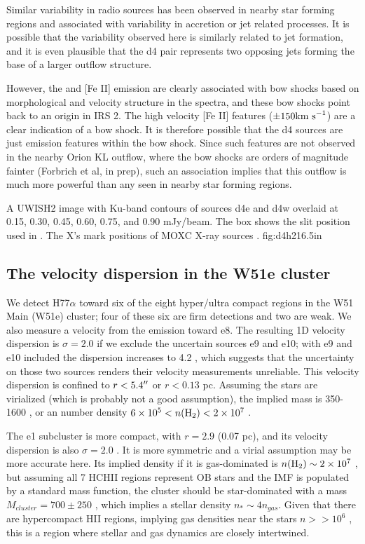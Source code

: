 Similar variability in radio sources has been observed in nearby star forming
regions \citep{Liu2014c,Forbrich2013a} and associated with variability in
accretion or jet related processes.  It is possible that the variability
observed here is similarly related to jet formation, and it is even plausible
that the d4 pair represents two opposing jets forming the base of a larger
outflow structure.

However, the \hh and [Fe II] emission are clearly associated with bow shocks
based on morphological and velocity structure in the \citet{Hodapp2002a}
spectra, and these bow shocks point back to an origin in IRS 2.  The high
velocity [Fe II] features ($\pm150 \textrm{km~s}^{-1}$) are a clear indication of a bow
shock.  It is therefore possible that the d4 sources are just emission features
within the bow shock.  Since such features are not observed in the nearby Orion
KL outflow, where the bow shocks are orders of magnitude fainter (Forbrich et
al, in prep), such an association implies that this outflow is much more
powerful than any seen in nearby star forming regions.

{A UWISH2 \hh image with Ku-band contours of sources d4e and d4w overlaid at
0.15, 0.30, 0.45, 0.60, 0.75, and 0.90 mJy/beam.  The box shows the slit
position used in \citet{Hodapp2002a}.  The X's mark positions of MOXC X-ray
sources \citep{Townsley2014a}.
}
{fig:d4h2}{1}{6.5in}

\subsection{The velocity dispersion in the W51e cluster}
\label{sec:vdisp}
We detect H77$\alpha$ toward six of the eight hyper/ultra compact \hii regions
in the W51 Main (W51e) cluster; four of these six are firm detections and two
are weak.  We also measure a velocity from the \formaldehyde emission toward
e8.  The resulting 1D velocity dispersion is $\sigma=2.0$ \kms if we exclude
the uncertain sources e9
and e10; with e9 and e10 included the dispersion increases to 4.2 \kms, which
suggests that the uncertainty on those two sources renders their velocity
measurements unreliable.  This velocity dispersion is confined to
$r<5.4\mbox{$^{\prime\prime}$}$ or $r<0.13$ pc.  Assuming the stars are virialized (which is
probably not a good assumption), the implied mass is 350-1600 \msun, or an \hh
number density $6\times10^{5} < n(\textrm{H}_{2}) < 2\times10^{7}$ \percc.

The e1 subcluster is more compact, with $r=2.9$ \arcsec (0.07 pc), and its
velocity dispersion is also $\sigma=2.0$ \kms.  It is more symmetric and a virial
assumption may be more accurate here.  Its implied density if it is gas-dominated
is $n(\textrm{H}_{2})\sim2\times10^{7}$ \percc, but assuming all 7 HCHII regions represent OB
stars and the IMF is populated by a standard \citet{Kroupa2001a} mass function,
the cluster should be star-dominated with a mass $M_{cluster}=700\pm250$ \msun,
which implies a stellar density $n_* \sim 4 n_{gas}$.  Given that there are 
hypercompact HII regions, implying gas densities near the stars $n>>10^6$ \percc,
this is a region where stellar and gas dynamics are closely intertwined.

